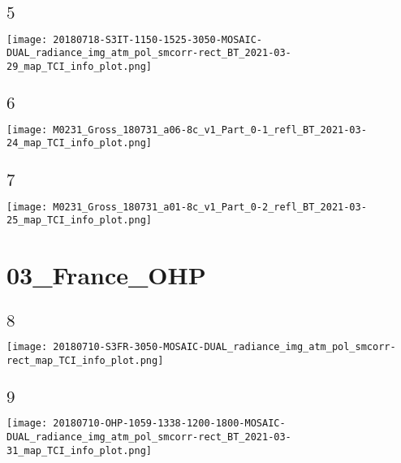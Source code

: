 \documentclass[9pt]{beamer}
\begin{document}
\subsection{$5$}
\begin{frame}
\begin{center}
\texttt{[image: 20180718-S3IT-1150-1525-3050-MOSAIC-DUAL\_radiance\_img\_atm\_pol\_smcorr-rect\_BT\_2021-03-29\_map\_TCI\_info\_plot.png]}
\end{center}
\end{frame}

\subsection{$6$}
\begin{frame}
\begin{center}
\texttt{[image: M0231\_Gross\_180731\_a06-8c\_v1\_Part\_0-1\_refl\_BT\_2021-03-24\_map\_TCI\_info\_plot.png]}
\end{center}
\end{frame}

\subsection{$7$}
\begin{frame}
\begin{center}
\texttt{[image: M0231\_Gross\_180731\_a01-8c\_v1\_Part\_0-2\_refl\_BT\_2021-03-25\_map\_TCI\_info\_plot.png]}
\end{center}
\end{frame}
\section{03\_France\_OHP}

\subsection{$8$}
\begin{frame}
\begin{center}
\texttt{[image: 20180710-S3FR-3050-MOSAIC-DUAL\_radiance\_img\_atm\_pol\_smcorr-rect\_map\_TCI\_info\_plot.png]}
\end{center}
\end{frame}

\subsection{$9$}
\begin{frame}
\begin{center}
\texttt{[image: 20180710-OHP-1059-1338-1200-1800-MOSAIC-DUAL\_radiance\_img\_atm\_pol\_smcorr-rect\_BT\_2021-03-31\_map\_TCI\_info\_plot.png]}
\end{center}
\end{frame}
\end{document}
